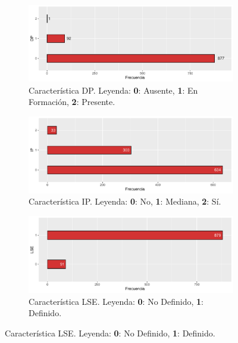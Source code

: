 \begin{figure}[p]
    \ContinuedFloat

    \begin{subfigure}{\textwidth}
        \includegraphics[width=\linewidth]{../../scripts/eda/eda_univar/char_dp_distr.pdf}
        \caption{Característica DP. Leyenda: \textbf{0}: Ausente, \textbf{1}: En Formación, \textbf{2}: Presente.}
        \label{fig4:todd_chars__dp}
    \end{subfigure}

    \begin{subfigure}{\textwidth}
        \includegraphics[width=\linewidth]{../../scripts/eda/eda_univar/char_ip_distr.pdf}
        \caption{Característica IP. Leyenda: \textbf{0}: No, \textbf{1}: Mediana, \textbf{2}: Sí.}
        \label{fig4:todd_chars__ip}
    \end{subfigure}

    \begin{subfigure}{\textwidth}
        \includegraphics[width=\linewidth]{../../scripts/eda/eda_univar/char_lse_distr.pdf}
        \caption{Característica LSE. Leyenda: \textbf{0}: No Definido, \textbf{1}: Definido.}
        \label{fig4:todd_chars__lse}
    \end{subfigure}

    \label{fig4:todd_chars}
\end{figure}
